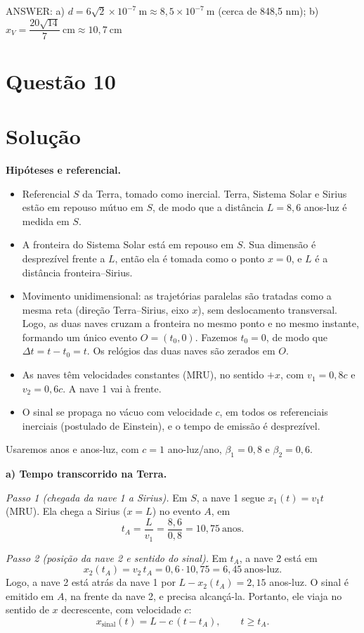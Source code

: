 \documentclass{article}%
\begin{document}
ANSWER: a) $d = 6\sqrt{2}\times 10^{-7}\ \text{m} \approx 8{,}5\times 10^{-7}\ \text{m}$ (cerca de 848,5 nm); b) $x_V = \dfrac{20\sqrt{14}}{7}\ \text{cm} \approx 10{,}7\ \text{cm}$%
\newpage%
\section*{Questão 10}

\section*{Solução}

\textbf{Hipóteses e referencial.}
\begin{itemize}
\item Referencial $S$ da Terra, tomado como inercial. Terra, Sistema Solar e Sirius estão em repouso mútuo em $S$, de modo que a distância $L = 8{,}6$ anos-luz é medida em $S$.
\item A fronteira do Sistema Solar está em repouso em $S$. Sua dimensão é desprezível frente a $L$, então ela é tomada como o ponto $x = 0$, e $L$ é a distância fronteira--Sirius.
\item Movimento unidimensional: as trajetórias paralelas são tratadas como a mesma reta (direção Terra--Sirius, eixo $x$), sem deslocamento transversal. Logo, as duas naves cruzam a fronteira no mesmo ponto e no mesmo instante, formando um único evento $O = (t_0, 0)$. Fazemos $t_0 = 0$, de modo que $\Delta t = t - t_0 = t$. Os relógios das duas naves são zerados em $O$.
\item As naves têm velocidades constantes (MRU), no sentido $+x$, com $v_1 = 0{,}8c$ e $v_2 = 0{,}6c$. A nave 1 vai à frente.
\item O sinal se propaga no vácuo com velocidade $c$, em todos os referenciais inerciais (postulado de Einstein), e o tempo de emissão é desprezível.
\end{itemize}

Usaremos anos e anos-luz, com $c = 1$ ano-luz/ano, $\beta_1 = 0{,}8$ e $\beta_2 = 0{,}6$.

\textbf{a) Tempo transcorrido na Terra.}

\textit{Passo 1 (chegada da nave 1 a Sirius).} Em $S$, a nave 1 segue $x_1(t) = v_1 t$ (MRU). Ela chega a Sirius ($x = L$) no evento $A$, em
\[
t_A = \frac{L}{v_1} = \frac{8{,}6}{0{,}8} = 10{,}75\ \text{anos}.
\]

\textit{Passo 2 (posição da nave 2 e sentido do sinal).} Em $t_A$, a nave 2 está em
\[
x_2(t_A) = v_2\,t_A = 0{,}6 \cdot 10{,}75 = 6{,}45\ \text{anos-luz}.
\]
Logo, a nave 2 está atrás da nave 1 por $L - x_2(t_A) = 2{,}15$ anos-luz. O sinal é emitido em $A$, na frente da nave 2, e precisa alcançá-la. Portanto, ele viaja no sentido de $x$ decrescente, com velocidade $c$:
\[
x_{\text{sinal}}(t) = L - c\,(t - t_A), \qquad t \geq t_A.
\]
\end{document}
